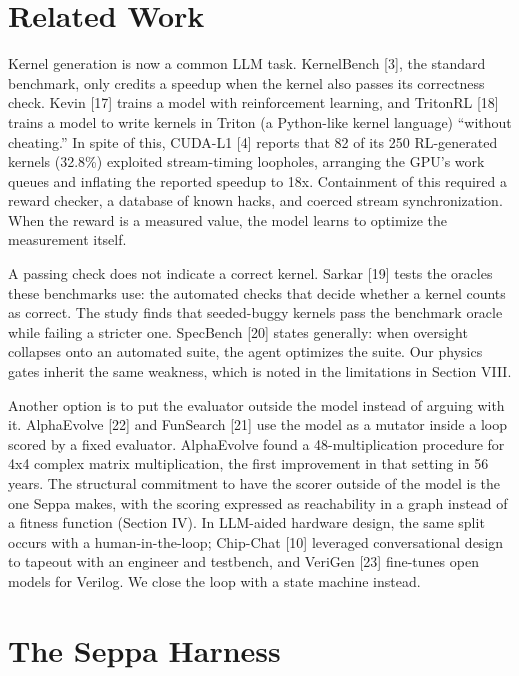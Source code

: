 \documentclass[conference]{IEEEtran}
\begin{document}
\section{Related Work}\label{related-work}

Kernel generation is now a common LLM task. KernelBench {[}3{]}, the
standard benchmark, only credits a speedup when the kernel also passes
its correctness check. Kevin {[}17{]} trains a model with reinforcement
learning, and TritonRL {[}18{]} trains a model to write kernels in
Triton (a Python-like kernel language) ``without cheating.'' In spite of
this, CUDA-L1 {[}4{]} reports that 82 of its 250 RL-generated kernels
(32.8\%) exploited stream-timing loopholes, arranging the GPU's work
queues and inflating the reported speedup to 18x. Containment of this
required a reward checker, a database of known hacks, and coerced stream
synchronization. When the reward is a measured value, the model learns
to optimize the measurement itself.

A passing check does not indicate a correct kernel. Sarkar {[}19{]}
tests the oracles these benchmarks use: the automated checks that decide
whether a kernel counts as correct. The study finds that seeded-buggy
kernels pass the benchmark oracle while failing a stricter one.
SpecBench {[}20{]} states generally: when oversight collapses onto an
automated suite, the agent optimizes the suite. Our physics gates
inherit the same weakness, which is noted in the limitations in Section
VIII.

Another option is to put the evaluator outside the model instead of
arguing with it. AlphaEvolve {[}22{]} and FunSearch {[}21{]} use the
model as a mutator inside a loop scored by a fixed evaluator.
AlphaEvolve found a 48-multiplication procedure for 4x4 complex matrix
multiplication, the first improvement in that setting in 56 years. The
structural commitment to have the scorer outside of the model is the one
Seppa makes, with the scoring expressed as reachability in a graph
instead of a fitness function (Section IV). In LLM-aided hardware
design, the same split occurs with a human-in-the-loop; Chip-Chat
{[}10{]} leveraged conversational design to tapeout with an engineer and
testbench, and VeriGen {[}23{]} fine-tunes open models for Verilog. We
close the loop with a state machine instead.

\section{The Seppa Harness}\label{the-seppa-harness}
\end{document}
